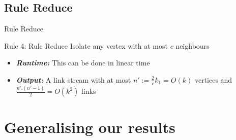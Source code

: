\documentclass{beamer}
\begin{document}
\subsection{Rule Reduce}
\begin{frame}{Rule Reduce}
  \begin{block}{Rule 4: Rule Reduce}
    Isolate any vertex with at most $c$ neighbours
  \end{block}
  \begin{block}
    \begin{itemize}
    \item \emph{\bfseries Runtime:} This can be done in linear time
    \item \emph{\bfseries Output:} A link stream with at most $n':=\frac{2}{c}k_1=O(k)$ vertices and $\frac{n'.(n'-1)}{2}=O(k^2)$ links
    \end{itemize}
  \end{block}
\end{frame}

\section{Generalising our results}
\end{document}
